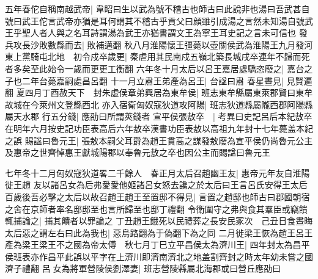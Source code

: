 五年春佗自稱南越武帝|{
	韋眧曰生以武為號不稽古也師古曰此說非也湯曰吾武甚自號曰武王佗言武帝亦猶是耳何謂其不稽古乎貢父曰顔雖引成湯之言然未知湯自號武王乎聖人者人與之名耳詩謂湯為武王亦猶書謂文王為寧王耳史記之言未可信也}
發兵攻長沙敗數縣而去|{
	敗補邁翻}
秋八月淮陽懷王彊薨以壺關侯武為淮陽王九月發河東上黨騎屯北地　初令戍卒歲更|{
	秦虐用其民南戍五嶺北築長城戌卒連年不歸而死者多矣至此始令一歲而更更工衡翻}
六年冬十月太后以呂王嘉居處驕恣廢之|{
	嘉台之子也二年台薨嘉嗣處昌呂翻}
十一月立肅王弟產為呂王|{
	台諡曰肅}
春星晝見|{
	見賢遍翻}
夏四月丁酉赦天下　封朱虚侯章弟興居為東牟侯|{
	班志東牟縣屬東萊郡賢曰東牟故城在今萊州文登縣西北}
亦入宿衛匈奴寇狄道攻阿陽|{
	班志狄道縣屬隴西郡阿陽縣屬天水郡}
行五分錢|{
	應劭曰所謂莢錢者}
宣平侯張敖卒　|{
	考異曰史記呂后本紀敖卒在明年六月按史記功臣表高后六年敖卒漢書功臣表敖以高祖九年封十七年薨盖本紀之誤}
賜諡曰魯元王|{
	張敖本嗣父耳爵為趙王貫高之謀發敖廢為宣平侯仍尚魯元公主及惠帝之世齊悼惠王獻城陽郡以奉魯元敖之卒也因公主而賜諡曰魯元王}


七年冬十二月匈奴寇狄道畧二千餘人　春正月太后召趙幽王友|{
	惠帝元年友自淮陽徙王趙}
友以諸呂女為后弗愛愛他姬諸呂女怒去讒之於太后曰王言呂氏安得王太后百歲後吾必擊之太后以故召趙王趙王至置邸不得見|{
	言置之趙邸也師古曰郡國朝宿之舍在京師者率名邸邸至也言所歸至也邸丁禮翻}
令衛圍守之弗與食其羣臣或竊饋輒捕論之|{
	捕其饋者以罪論之}
丁丑趙王餓死以民禮葬之長安民冢次　己丑日食晝晦太后惡之謂左右曰此為我也|{
	惡烏路翻為于偽翻下為之同}
二月徙梁王恢為趙王呂王產為梁王梁王不之國為帝太傅　秋七月丁巳立平昌侯太為濟川王|{
	四年封太為昌平侯班表亦作昌平此誤以平字在上濟川即濟南濟北之地盖割齊封之時太年幼未嘗之國濟子禮翻}
呂女為將軍營陵侯劉澤妻|{
	班志營陵縣屬北海郡或曰營丘應劭曰}


